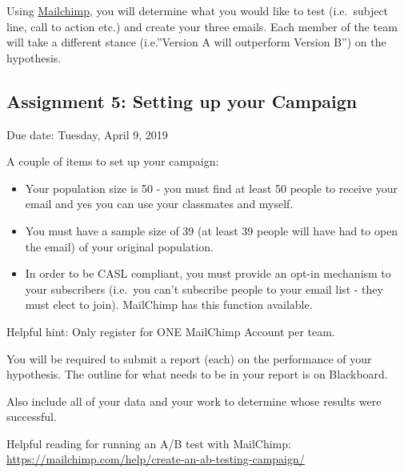 \documentclass[]{article}
\providecommand{\tightlist}{%
  \setlength{\itemsep}{0pt}\setlength{\parskip}{0pt}}
\begin{document}
Using \href{https://mailchimp.com/}{Mailchimp}, you will determine what
you would like to test (i.e.~subject line, call to action etc.) and
create your three emails. Each member of the team will take a different
stance (i.e.''Version A will outperform Version B'') on the hypothesis.

\subsection{Assignment 5: Setting up your
Campaign}\label{assignment-5-setting-up-your-campaign}

Due date: Tuesday, April 9, 2019

A couple of items to set up your campaign:

\begin{itemize}
\tightlist
\item
  Your population size is 50 - you must find at least 50 people to
  receive your email and yes you can use your classmates and myself.
\item
  You must have a sample size of 39 (at least 39 people will have had to
  open the email) of your original population.
\item
  In order to be CASL compliant, you must provide an opt-in mechanism to
  your subscribers (i.e.~you can't subscribe people to your email list -
  they must elect to join). MailChimp has this function available.
\end{itemize}

Helpful hint: Only register for ONE MailChimp Account per team.

You will be required to submit a report (each) on the performance of
your hypothesis. The outline for what needs to be in your report is on
Blackboard.

Also include all of your data and your work to determine whose results
were successful.

Helpful reading for running an A/B test with MailChimp:
\url{https://mailchimp.com/help/create-an-ab-testing-campaign/}
\end{document}
